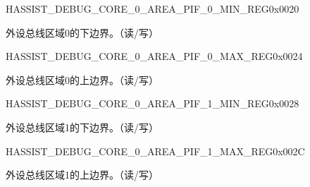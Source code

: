 \begin{register}{H}{ASSIST\_DEBUG\_CORE\_0\_AREA\_PIF\_0\_MIN\_REG}{0x0020}\label{regdesc:ASSISTDEBUGCORE0AREAPIF0MINREG}
%
\regnewline%
\begin{regdesc}\begin{reglist}
\label{fielddesc:ASSISTDEBUGCORE0AREAPIF0MIN}\item [ASSIST\_DEBUG\_CORE\_0\_AREA\_PIF\_0\_MIN] 外设总线区域0的下边界。（读/写）
\end{reglist}\end{regdesc}
\end{register}


\begin{register}{H}{ASSIST\_DEBUG\_CORE\_0\_AREA\_PIF\_0\_MAX\_REG}{0x0024}\label{regdesc:ASSISTDEBUGCORE0AREAPIF0MAXREG}
%
\regnewline%
\begin{regdesc}\begin{reglist}
\label{fielddesc:ASSISTDEBUGCORE0AREAPIF0MAX}\item [ASSIST\_DEBUG\_CORE\_0\_AREA\_PIF\_0\_MAX] 外设总线区域0的上边界。（读/写）
\end{reglist}\end{regdesc}
\end{register}


\begin{register}{H}{ASSIST\_DEBUG\_CORE\_0\_AREA\_PIF\_1\_MIN\_REG}{0x0028}\label{regdesc:ASSISTDEBUGCORE0AREAPIF1MINREG}
%
\regnewline%
\begin{regdesc}\begin{reglist}
\label{fielddesc:ASSISTDEBUGCORE0AREAPIF1MIN}\item [ASSIST\_DEBUG\_CORE\_0\_AREA\_PIF\_1\_MIN] 外设总线区域1的下边界。（读/写）
\end{reglist}\end{regdesc}
\end{register}


\begin{register}{H}{ASSIST\_DEBUG\_CORE\_0\_AREA\_PIF\_1\_MAX\_REG}{0x002C}\label{regdesc:ASSISTDEBUGCORE0AREAPIF1MAXREG}
%
\regnewline%
\begin{regdesc}\begin{reglist}
\label{fielddesc:ASSISTDEBUGCORE0AREAPIF1MAX}\item [ASSIST\_DEBUG\_CORE\_0\_AREA\_PIF\_1\_MAX] 外设总线区域1的上边界。（读/写）
\end{reglist}\end{regdesc}
\end{register}


